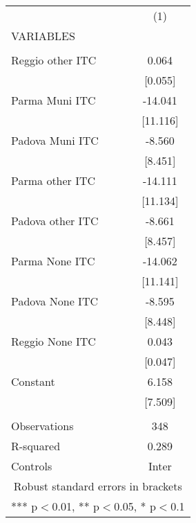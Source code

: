 \begin{tabular}{lc} \hline
 & (1) \\
VARIABLES &  \\ \hline
 &  \\
Reggio other ITC & 0.064 \\
 & [0.055] \\
Parma Muni ITC & -14.041 \\
 & [11.116] \\
Padova Muni ITC & -8.560 \\
 & [8.451] \\
Parma other ITC & -14.111 \\
 & [11.134] \\
Padova other ITC & -8.661 \\
 & [8.457] \\
Parma None ITC & -14.062 \\
 & [11.141] \\
Padova None ITC & -8.595 \\
 & [8.448] \\
Reggio None ITC & 0.043 \\
 & [0.047] \\
Constant & 6.158 \\
 & [7.509] \\
 &  \\
Observations & 348 \\
R-squared & 0.289 \\
 Controls & Inter \\ \hline
\multicolumn{2}{c}{ Robust standard errors in brackets} \\
\multicolumn{2}{c}{ *** p$<$0.01, ** p$<$0.05, * p$<$0.1} \\
\end{tabular}
